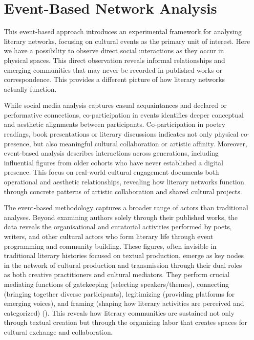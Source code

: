 \documentclass{jcls}
\begin{document}
\section{Event-Based Network Analysis}

This event-based approach introduces an experimental framework for analysing literary networks, focusing on cultural events as the primary unit of interest. Here we have a possibility to observe direct social interactions as they occur in physical spaces. This direct observation reveals informal relationships and emerging communities that may never be recorded in published works or correspondence. This provides a different picture of how literary networks actually function.

While social media analysis captures casual acquaintances and declared or performative connections, co-participation in events identifies deeper conceptual and aesthetic alignments between participants. Co-participation in poetry readings, book presentations or literary discussions indicates not only physical co-presence, but also meaningful cultural collaboration or artistic affinity. Moreover, event-based analysis describes interactions across generations, including influential figures from older cohorts who have never established a digital presence. This focus on real-world cultural engagement documents both operational and aesthetic relationships, revealing how literary networks function through concrete patterns of artistic collaboration and shared cultural projects.

The event-based methodology captures a broader range of actors than traditional analyses. Beyond examining authors solely through their published works, the data reveals the organisational and curatorial activities performed by poets, writers, and other cultural actors who form literary life through event programming and community building. These figures, often invisible in traditional literary histories focused on textual production, emerge as key nodes in the network of cultural production and transmission through their dual roles as both creative practitioners and cultural mediators. They perform crucial mediating functions of gatekeeping (selecting speakers/themes), connecting (bringing together diverse participants), legitimizing (providing platforms for emerging voices), and framing (shaping how literary activities are perceived and categorized) (\cite{janssen2015}). This reveals how literary communities are sustained not only through textual creation but through the organizing labor that creates spaces for cultural exchange and collaboration.
\end{document}
